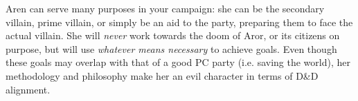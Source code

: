 \begin{note}
  Aren can serve many purposes in your campaign: she can be the secondary
  villain, prime villain, or simply be an aid to the party, preparing them
  to face the actual villain. She will \emph{never} work towards the doom of
  Aror, or its citizens on purpose, but will use \emph{whatever means
    necessary} to achieve goals. Even though these goals may overlap with
  that of a good PC party (i.e. saving the world), her methodology and
  philosophy make her an evil character in terms of D\&D alignment.
\end{note}
